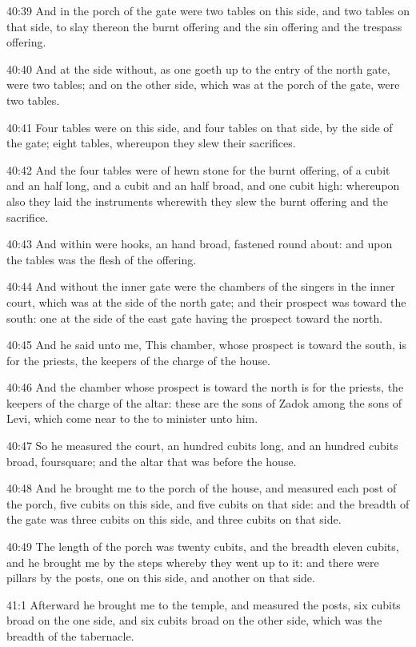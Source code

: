 40:39 And in the porch of the gate were two tables on this side, and two tables on that side, to slay thereon the burnt offering and the sin offering and the trespass offering.

40:40 And at the side without, as one goeth up to the entry of the north gate, were two tables; and on the other side, which was at the porch of the gate, were two tables.

40:41 Four tables were on this side, and four tables on that side, by the side of the gate; eight tables, whereupon they slew their sacrifices.

40:42 And the four tables were of hewn stone for the burnt offering, of a cubit and an half long, and a cubit and an half broad, and one cubit high: whereupon also they laid the instruments wherewith they slew the burnt offering and the sacrifice.

40:43 And within were hooks, an hand broad, fastened round about: and upon the tables was the flesh of the offering.

40:44 And without the inner gate were the chambers of the singers in the inner court, which was at the side of the north gate; and their prospect was toward the south: one at the side of the east gate having the prospect toward the north.

40:45 And he said unto me, This chamber, whose prospect is toward the south, is for the priests, the keepers of the charge of the house.

40:46 And the chamber whose prospect is toward the north is for the priests, the keepers of the charge of the altar: these are the sons of Zadok among the sons of Levi, which come near to the \LORD to minister unto him.

40:47 So he measured the court, an hundred cubits long, and an hundred cubits broad, foursquare; and the altar that was before the house.

40:48 And he brought me to the porch of the house, and measured each post of the porch, five cubits on this side, and five cubits on that side: and the breadth of the gate was three cubits on this side, and three cubits on that side.

40:49 The length of the porch was twenty cubits, and the breadth eleven cubits, and he brought me by the steps whereby they went up to it: and there were pillars by the posts, one on this side, and another on that side.

41:1 Afterward he brought me to the temple, and measured the posts, six cubits broad on the one side, and six cubits broad on the other side, which was the breadth of the tabernacle.

